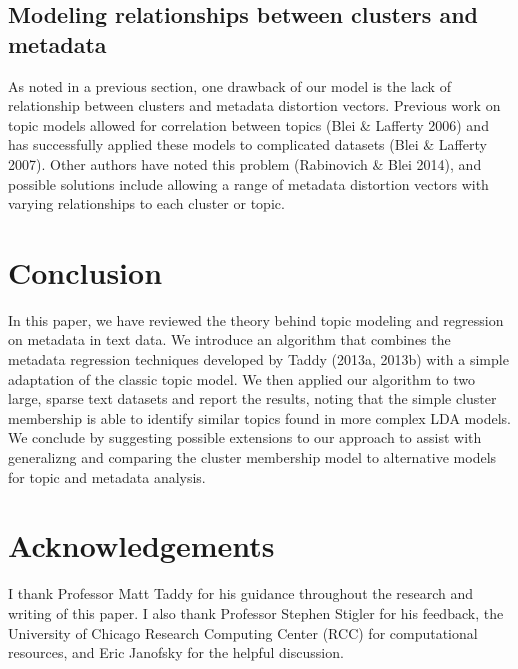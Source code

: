 \documentclass[12pt]{article}
\begin{document}
\subsection{Modeling relationships between clusters and metadata}
As noted in a previous section, one drawback of our model is the lack of relationship between clusters and metadata distortion vectors. 
Previous work on topic models allowed for correlation between topics (Blei \& Lafferty 2006) and has successfully applied these models to complicated datasets (Blei \& Lafferty 2007).
Other authors have noted this problem (Rabinovich \& Blei 2014), and possible solutions include allowing a range of metadata distortion vectors with varying relationships to each cluster or topic. 


\section{Conclusion}\label{conclusion}

In this paper, we have reviewed the theory behind topic modeling and regression on metadata in text data. 
We introduce an algorithm that combines the metadata regression techniques developed by Taddy (2013a, 2013b) with a simple adaptation of the classic topic model.
We then applied our algorithm to two large, sparse text datasets and report the results, noting that the simple cluster membership is able to identify similar topics found in more complex LDA models. 
We conclude by suggesting possible extensions to our approach to assist with generalizng and comparing the cluster membership model to alternative models for topic and metadata analysis. 


\section{Acknowledgements}\label{conclusion}

I thank Professor Matt Taddy for his guidance throughout the research and writing of this paper. I also thank Professor Stephen Stigler for his feedback, the University of Chicago Research Computing Center (RCC) for computational resources, and Eric Janofsky for the helpful discussion. 


\newpage

\end{document}
